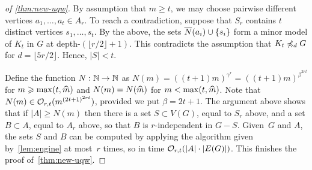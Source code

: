 \begin{proof}[of \cref{thm:new-uqw}]
By assumption that $m\ge t$, we may choose pairwise different vertices $a_1,\ldots,a_t\in A_r$.
To reach a contradiction, suppose that $S_r$ contains $t$ distinct vertices $s_1,\ldots,s_t$. 
By the above, the sets $\overline{N}(a_i)\cup\{s_i\}$ 
form a minor model of $K_t$ in $G$ at depth-$(\lfloor r/2\rfloor+1)$.
This contradicts the assumption that $K_t\not\preccurlyeq_d G$ for $d=\lfloor 5r/2 \rfloor$.
Hence, $|S|<t$.


Define the function  $N:\mathbb{N}\to\mathbb{N}$
as $N(m)=((t+1)m)^{\gamma^{r}}=((t+1)m)^{\beta^{2rt}}$
for $m\geqslant \max(t,\widehat{m})$  and $N(m)=N(\widehat{m})$ for $m<\max(t,\widehat{m})$.
Note that $N(m)\in \mathcal{O}_{r,t}{(m^{{(2t+1)}^{2rt}})}$, provided we put $\beta=2t+1$.
The argument above shows that if $|A|\ge N(m)$ then 
there is a set $S\subset V(G)$, equal to $S_r$ above,
and a set $B\subset A$, equal to $A_r$ above,
so that $B$ is $r$-independent in $G-S$.
Given~$G$ and $A$, the sets $S$ and $B$ can be computed by applying the algorithm given by~\cref{lem:engine} at most~$r$ times, so in time $\mathcal{O}_{r,t}(|A|\cdot |E(G)|)$.
This finishes the proof of~\cref{thm:new-uqw}.
\end{proof}


